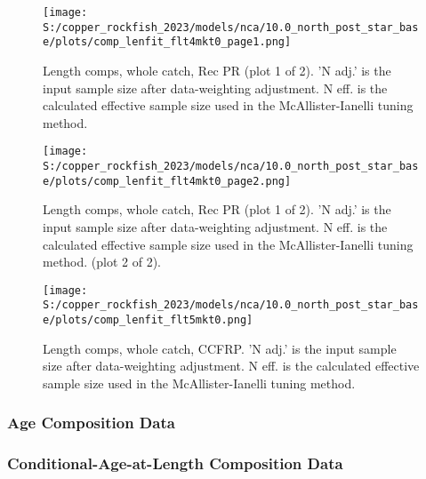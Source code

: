 \documentclass[11pt,
  letterpaper,
]{article}
\begin{document}
\begin{figure}
{\centering
\texttt{[image: S:/copper\_rockfish\_2023/models/nca/10.0\_north\_post\_star\_base/plots/comp\_lenfit\_flt4mkt0\_page1.png]}
}
\caption{Length comps, whole catch, Rec PR (plot 1 of 2).  'N adj.' is the input sample size after data-weighting adjustment. N eff. is the calculated effective sample size used in the McAllister-Ianelli tuning method.\label{fig:comp-lenfit-flt4mkt0-page1}}
\end{figure}

\begin{figure}
{\centering
\texttt{[image: S:/copper\_rockfish\_2023/models/nca/10.0\_north\_post\_star\_base/plots/comp\_lenfit\_flt4mkt0\_page2.png]}
}
\caption{Length comps, whole catch, Rec PR (plot 1 of 2).  'N adj.' is the input sample size after data-weighting adjustment. N eff. is the calculated effective sample size used in the McAllister-Ianelli tuning method. (plot 2 of 2).\label{fig:comp-lenfit-flt4mkt0-page2}}
\end{figure}

\begin{figure}
{\centering
\texttt{[image: S:/copper\_rockfish\_2023/models/nca/10.0\_north\_post\_star\_base/plots/comp\_lenfit\_flt5mkt0.png]}
}
\caption{Length comps, whole catch, CCFRP.  'N adj.' is the input sample size after data-weighting adjustment. N eff. is the calculated effective sample size used in the McAllister-Ianelli tuning method.\label{fig:comp-lenfit-flt5mkt0}}
\end{figure}

\newpage

\subsubsection{Age Composition Data}\label{age-data}

\newpage

\subsubsection{Conditional-Age-at-Length Composition Data}\label{caal-data}
\end{document}
